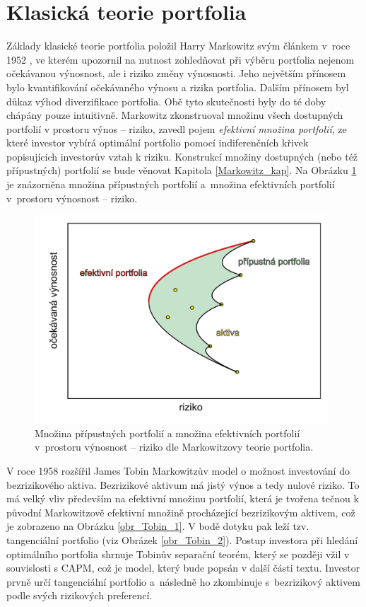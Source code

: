 \documentclass[a4paper,12pt]{report}
\theoremstyle{definition} \newtheorem{definice}[veta]{Definice}
\theoremstyle{remark}
\begin{document}


\section{Klasická teorie portfolia}\label{KTP}

Základy klasické teorie portfolia položil Harry Markowitz svým článkem v~roce 1952 \cite{markowitz}, ve kterém upozornil na nutnost zohledňovat při výběru portfolia nejenom očekávanou výnosnost, ale i riziko změny výnosnosti.
Jeho největším přínosem bylo kvantifikování očekávaného výnosu a rizika portfolia. 
Dalším přínosem byl důkaz výhod diverzifikace portfolia.
Obě tyto skutečnosti byly do té doby chápány pouze intuitivně.
Markowitz zkonstruoval množinu všech dostupných portfolií v prostoru výnos -- riziko, zavedl pojem \textit{efektivní množina portfolií}, ze které investor vybírá optimální portfolio pomocí indiferenčních křivek popisujících investorův vztah k riziku.
Konstrukcí množiny dostupných (nebo též přípustných) portfolií se bude věnovat Kapitola \ref{Markowitz_kap}. 
Na Obrázku \ref{obr_Markowitz} je znázorněna množina přípustných portfolií  a~množina efektivních portfolií v~prostoru výnosnost -- riziko. 

\begin{figure}[!htbp]
  \centering 
  \includegraphics[width=11cm]{IMG/graf_2a.pdf}
  \caption{Množina přípustných portfolií  a množina efektivních portfolií v~prostoru výnosnost -- riziko dle Markowitzovy teorie portfolia.} 
  \label{obr_Markowitz}
\end{figure}

V roce 1958 rozšířil James Tobin \cite{tobin} Markowitzův model o možnost investování do bezrizikového aktiva.
Bezrizikové aktivum má jistý výnos a tedy nulové riziko.
To má velký vliv především na efektivní množinu portfolií, která je tvořena tečnou k původní Markowitzově efektivní množině procházející bezrizikovým aktivem, což je zobrazeno na Obrázku \ref{obr_Tobin_1}.
V bodě dotyku pak leží tzv. tangenciální portfolio (viz Obrázek \ref{obr_Tobin_2}).
Postup investora při hledání optimálního portfolia shrnuje Tobinův separační teorém, který se později vžil v souvislosti s CAPM, což je model, který bude popsán v další části textu. %
Investor prvně určí tangenciální portfolio a~následně ho zkombinuje s~bezrizikový aktivem podle svých rizikových preferencí.
\end{document}
